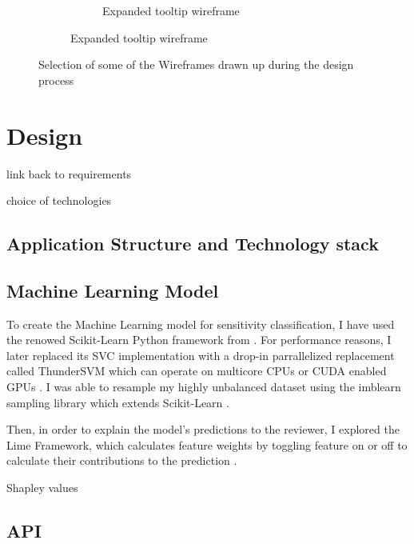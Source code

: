 \documentclass{l4proj}
\begin{document}
\begin{figure}
\begin{subfigure}[b]{\linewidth}
\begin{subfigure}[b]{0.4\linewidth}
            \caption{Expanded tooltip wireframe}
            \label{fig:expanded-tooltip-wireframe}
        \end{subfigure}
    \end{subfigure}
    \caption{Selection of some of the Wireframes drawn up during the design process}
    \label{fig:wireframes}
    
\end{figure}


\chapter{Design}

link back to requirements

choice of technologies

\section{Application Structure and Technology stack}

\section{Machine Learning Model}

To create the Machine Learning model for sensitivity classification, I have used the renowed Scikit-Learn Python framework from \textcite{pedregosaScikitlearnMachineLearning2011}.
For performance reasons, I later replaced its SVC implementation with a drop-in parrallelized replacement called ThunderSVM which can operate on multicore CPUs or CUDA enabled GPUs \autocite{wenThunderSVMFastSVM2018}.
I was able to resample my highly unbalanced dataset using the imblearn sampling library which extends Scikit-Learn \autocite{lemaitreImbalancedlearnPythonToolbox2017}.

Then, in order to explain the model's predictions to the reviewer, I explored the Lime Framework, which calculates feature weights by toggling feature on or off to calculate their contributions to the prediction \autocite{ribeiroWhyShouldTrust2016a}.

\autocite{lundbergUnifiedApproachInterpreting2017a} Shapley values

\section{API}
\end{document}
